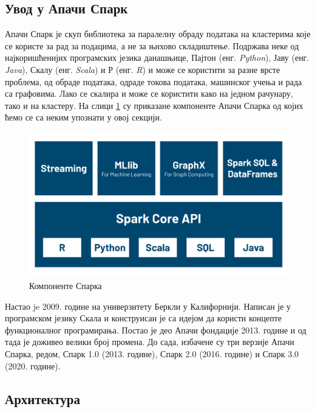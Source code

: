\documentclass[12pt,oneside]{memoir}
\begin{document}
\subsection{Увод у Апачи Спарк}
\label{subsec:spark_intro}

Апачи Спарк је скуп библиотека за паралелну обраду података на кластерима које се користе за рад за подацима, а не за њихово складиштење. Подржава  неке од најкоришћенијих програмских језика данашњице, Пајтон (енг. \textit{Python}), Јаву (енг. \textit{Java}), Скалу (енг. \textit{Scala}) и Р (енг. \textit{R}) и може се користити за разне врсте проблема, од обраде података, одраде токова података, машинског учења и рада са графовима. Лако се скалира и може се користити како на једном рачунару, тако и на кластеру. На слици \ref{fig:spark_kompot} су приказане компоненте Апачи Спарка од којих ћемо се са неким упознати у овој секцији. \cite{spark_guide}

\begin{figure}[!ht]
  \centering
  \includegraphics[width=1\textwidth]{pictures/spark_components.png}
  \caption{Компоненте Спарка}
  \label{fig:spark_kompot}
\end{figure}

Настао je 2009. године на универзитету Беркли у Калифорнији. Написан је у програмском језику Скала и конструисан је са идејом да користи концепте функционалног програмирања. Постао је део Апачи фондације 2013. године и од тада је доживео велики број промена. До сада, избачене су три верзије Апачи Спарка, редом, Спарк 1.0 (2013. године), Спарк 2.0 (2016. године) и Спарк 3.0 (2020. године).

\subsection{Архитектура}
\label{subsec:spark_arx}
\end{document}
